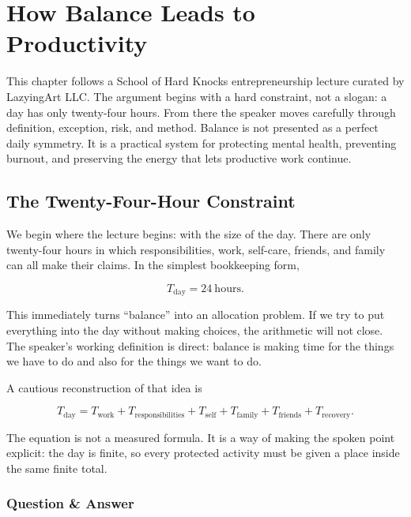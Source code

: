 \chapter{How Balance Leads to Productivity}

This chapter follows a School of Hard Knocks entrepreneurship lecture curated by LazyingArt LLC. The argument begins with a hard constraint, not a slogan: a day has only twenty-four hours. From there the speaker moves carefully through definition, exception, risk, and method. Balance is not presented as a perfect daily symmetry. It is a practical system for protecting mental health, preventing burnout, and preserving the energy that lets productive work continue.

\section{The Twenty-Four-Hour Constraint}

We begin where the lecture begins: with the size of the day. There are only twenty-four hours in which responsibilities, work, self-care, friends, and family can all make their claims. In the simplest bookkeeping form,

\begin{equation}
T_{\mathrm{day}} = 24\ \mathrm{hours}.
\end{equation}

This immediately turns ``balance'' into an allocation problem. If we try to put everything into the day without making choices, the arithmetic will not close. The speaker's working definition is direct: balance is making time for the things we have to do and also for the things we want to do.

A cautious reconstruction of that idea is

\begin{equation}
T_{\mathrm{day}}
=
T_{\mathrm{work}}
+
T_{\mathrm{responsibilities}}
+
T_{\mathrm{self}}
+
T_{\mathrm{family}}
+
T_{\mathrm{friends}}
+
T_{\mathrm{recovery}}.
\end{equation}

The equation is not a measured formula. It is a way of making the spoken point explicit: the day is finite, so every protected activity must be given a place inside the same finite total.

\subsection{Question \& Answer}


